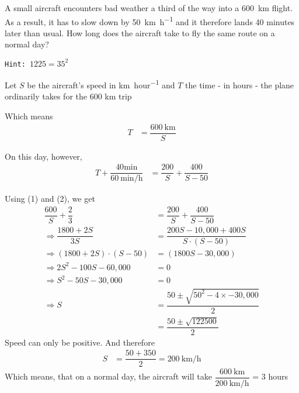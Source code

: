 

\question[3]  A small aircraft encounters bad weather a third of the way
into a \SI{600}{\kilo\meter} flight. As a result, it has to slow down by
\SI{50}{\kilo\meter\per\hour} and it therefore lands 40 minutes later than usual. How
long does the aircraft take to fly the same route on a normal day?

\texttt{Hint: $1225 = 35^2$}


\ifprintanswers
\fi 

\begin{solution}[\fullpage]
	Let $S$ be the aircraft's speed in \si{km\per hour} and $T$ the time - in hours -
	the plane ordinarily takes for the 600 km trip
	
	Which means
	\begin{align}
		T &= \dfrac{\SI{600}{\kilo\meter}}{S}
	\end{align}
	
	On this day, however,
	\begin{align}
		T + \dfrac{40 \si{\minute}}{\SI{60}{\minute\per\hour}} &= \dfrac{200}{S} + \dfrac{400}{S-50}
	\end{align}
	
	Using (1) and (2), we get 
	\begin{align}
		\dfrac{600}{S} + \dfrac{2}{3} &= \dfrac{200}{S} + \dfrac{400}{S-50} \\
		\Rightarrow \dfrac{1800+2S}{3S} &= \dfrac{200S-10,000+400S}{S\cdot(S-50)} \\
		\Rightarrow (1800+2S)\cdot(S-50) &= (1800S - 30,000) \\
		\Rightarrow 2S^2-100S-60,000 &= 0 \\
		\Rightarrow S^2-50S-30,000 &= 0 \\
		\Rightarrow S &= \dfrac{50\pm\sqrt{50^2-4\times-30,000}}{2} \\
		              &= \dfrac{50\pm\sqrt{122500}}{2}
	\end{align}
	Speed can only be positive. And therefore
	\begin{align}
		S &= \dfrac{50+350}{2} = \SI{200}{\kilo\meter\per\hour}
	\end{align}
	Which means, that on a normal day, the aircraft will take 
	$\dfrac{\SI{600}{\kilo\meter}}{\SI{200}{\kilo\meter\per\hour}}$ = 3 hours
	
\end{solution}
